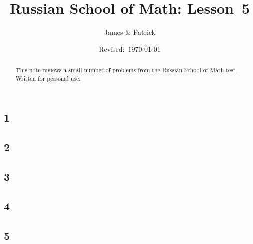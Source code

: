 \documentclass[12pt]{article}
\title{Russian School of Math: Lesson~5}
\author{James \& Patrick}
\date{Revised:~\today}
\begin{document}
\maketitle
\begin{abstract}\setlength{\parindent}{0pt}%
This note reviews a small number of problems from the Russian School of Math test. Written for personal use.
\end{abstract}

\thispagestyle{empty}
\clearpage

\subsection*{1}

\begin{solution}
  
\end{solution}

\subsection*{2}

\begin{solution}
  
\end{solution}

\subsection*{3}

\begin{solution}
  
\end{solution}

\subsection*{4}

\begin{solution}
  
\end{solution}

\subsection*{5}

\begin{solution}
  
\end{solution}
\end{document}
